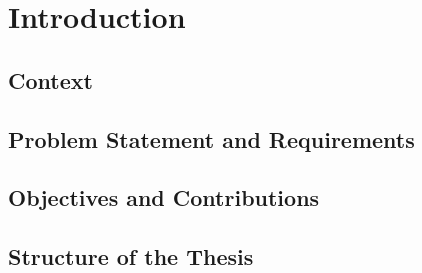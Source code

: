 \chapter{Introduction}
\label{chap:introduction}

\section{Context}
\section{Problem Statement and Requirements}
\section{Objectives and Contributions}
\section{Structure of the Thesis}
